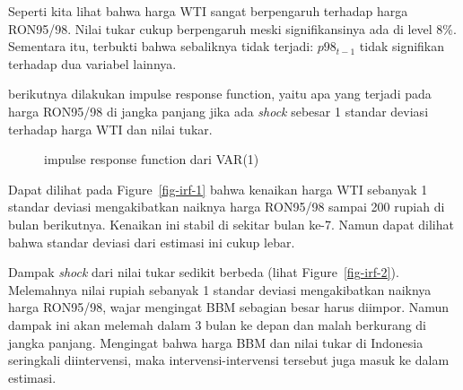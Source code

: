 \documentclass[
  a4paper,
  DIV=11,
  numbers=noendperiod]{scrreprt}
\begin{document}
Seperti kita lihat bahwa harga WTI sangat berpengaruh terhadap harga
RON95/98. Nilai tukar cukup berpengaruh meski signifikansinya ada di
level 8\%. Sementara itu, terbukti bahwa sebaliknya tidak terjadi:
\(p98_{t-1}\) tidak signifikan terhadap dua variabel lainnya.

berikutnya dilakukan impulse response function, yaitu apa yang terjadi
pada harga RON95/98 di jangka panjang jika ada \emph{shock} sebesar 1
standar deviasi terhadap harga WTI dan nilai tukar.

\begin{figure}

\begin{minipage}[t]{0.50\linewidth}

{\centering 


}

\end{minipage}%
%
\begin{minipage}[t]{0.50\linewidth}

{\centering 


}

\end{minipage}%

\caption{\label{fig-irf}impulse response function dari VAR(1)}

\end{figure}

Dapat dilihat pada Figure~\ref{fig-irf-1} bahwa kenaikan harga WTI
sebanyak 1 standar deviasi mengakibatkan naiknya harga RON95/98 sampai
200 rupiah di bulan berikutnya. Kenaikan ini stabil di sekitar bulan
ke-7. Namun dapat dilihat bahwa standar deviasi dari estimasi ini cukup
lebar.

Dampak \emph{shock} dari nilai tukar sedikit berbeda (lihat
Figure~\ref{fig-irf-2}). Melemahnya nilai rupiah sebanyak 1 standar
deviasi mengakibatkan naiknya harga RON95/98, wajar mengingat BBM
sebagian besar harus diimpor. Namun dampak ini akan melemah dalam 3
bulan ke depan dan malah berkurang di jangka panjang. Mengingat bahwa
harga BBM dan nilai tukar di Indonesia seringkali diintervensi, maka
intervensi-intervensi tersebut juga masuk ke dalam estimasi.
\end{document}
